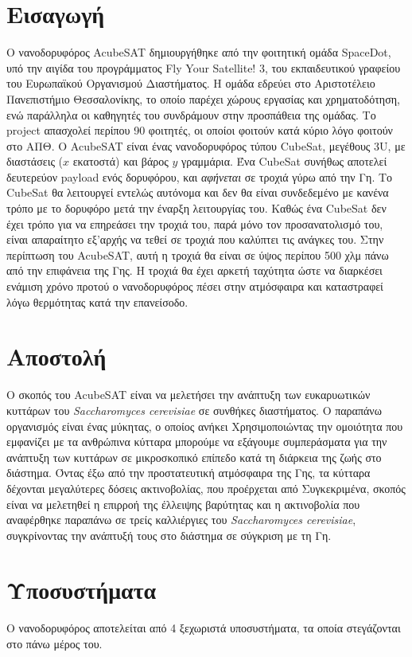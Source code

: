 \documentclass[a4paper,nobib,justified]{tufte-book}
\begin{document}
\section{Εισαγωγή}
Ο νανοδορυφόρος AcubeSAT δημιουργήθηκε από την φοιτητική ομάδα SpaceDot, υπό την αιγίδα του προγράμματος Fly Your Satellite! 3, του εκπαιδευτικού γραφείου του Ευρωπαϊκού Οργανισμού Διαστήματος. Η ομάδα εδρεύει στο Αριστοτέλειο Πανεπιστήμιο Θεσσαλονίκης, το οποίο παρέχει χώρους εργασίας και χρηματοδότηση, ενώ παράλληλα οι καθηγητές του συνδράμουν στην προσπάθεια της ομάδας. Το project απασχολεί περίπου 90 φοιτητές, οι οποίοι φοιτούν κατά κύριο λόγο φοιτούν στο ΑΠΘ. Ο AcubeSAT είναι ένας νανοδορυφόρος τύπου CubeSat, μεγέθους 3U, με διαστάσεις ($x$ εκατοστά) και βάρος $y$ γραμμάρια. Ένα CubeSat συνήθως αποτελεί δευτερεύον payload ενός δορυφόρου, και \emph{αφήνεται} σε τροχιά γύρω από την Γη. Το CubeSat θα λειτουργεί εντελώς αυτόνομα και δεν θα είναι συνδεδεμένο με κανένα τρόπο με το δορυφόρο μετά την έναρξη λειτουργίας του. Καθώς ένα CubeSat δεν έχει τρόπο για να επηρεάσει την τροχιά του, παρά μόνο τον προσανατολισμό του, είναι απαραίτητο εξ'αρχής να τεθεί σε τροχιά που καλύπτει τις ανάγκες του. Στην περίπτωση του AcubeSAT, αυτή η τροχιά θα είναι σε ύψος περίπου 500 χλμ πάνω από την επιφάνεια της Γης. Η τροχιά θα έχει αρκετή ταχύτητα ώστε να διαρκέσει ενάμιση χρόνο προτού ο νανοδορυφόρος πέσει στην ατμόσφαιρα και καταστραφεί λόγω θερμότητας κατά την επανείσοδο.

\section{Αποστολή}
Ο σκοπός του AcubeSAT είναι να μελετήσει την ανάπτυξη των ευκαρυωτικών κυττάρων του \emph{Saccharomyces cerevisiae} σε συνθήκες διαστήματος. Ο παραπάνω οργανισμός είναι ένας μύκητας, ο οποίος ανήκει %
Χρησιμοποιώντας την ομοιότητα που εμφανίζει με τα ανθρώπινα κύτταρα μπορούμε να εξάγουμε συμπεράσματα για την ανάπτυξη των κυττάρων σε μικροσκοπικό επίπεδο κατά τη διάρκεια της ζωής στο διάστημα. Όντας έξω από την προστατευτική ατμόσφαιρα της Γης, τα κύτταρα δέχονται μεγαλύτερες δόσεις ακτινοβολίας, που προέρχεται από %
Συγκεκριμένα, σκοπός είναι να μελετηθεί η επιρροή της έλλειψης βαρύτητας και η ακτινοβολία που αναφέρθηκε παραπάνω σε τρείς καλλιέργιες του \emph{Saccharomyces cerevisiae}, συγκρίνοντας την ανάπτυξή τους στο διάστημα σε σύγκριση με τη Γη.
\section{Υποσυστήματα}
Ο νανοδορυφόρος αποτελείται από 4 ξεχωριστά υποσυστήματα, τα οποία στεγάζονται στο πάνω μέρος του.
\end{document}

